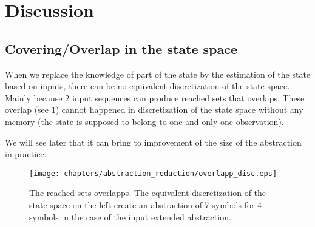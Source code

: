 \section{Discussion}
%

\subsection{Covering/Overlap in the state space}
When we replace the knowledge of part of the state by the estimation of the state based on inputs, there can be no equivalent discretization of the state space.
Mainly because 2 input sequences can produce reached sets that overlaps.
These overlap (see \ref{fig:overlapp}) cannot happened in discretization of the state space without any memory (the state is supposed to belong to one and only one observation).

We will see later that it can bring to improvement of the size of the abstraction in practice.

\begin{figure}
\centering
\begin{minipage}[b]{0.49\textwidth}
	\texttt{[image: chapters/abstraction\_reduction/overlapp\_disc.eps]}
\end{minipage}
\caption{The reached sets overlapps. The equivalent discretization of the state space on the left create an abstraction of 7 symbols for 4 symbols in the case of the input extended abstraction.}
\label{fig:overlapp}
\end{figure}



